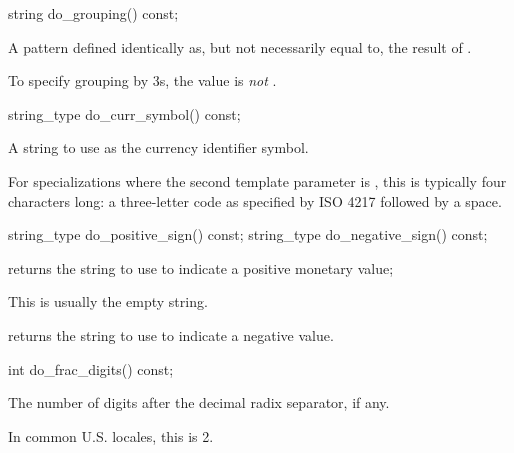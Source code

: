 %
\begin{itemdecl}
string do_grouping() const;
\end{itemdecl}

\begin{itemdescr}
\pnum
\returns
A pattern defined identically as, but not necessarily equal to,
the result of .
\begin{footnote}
To specify grouping by 3s,
the value is  \textit{not} .
\end{footnote}
\end{itemdescr}

%
\begin{itemdecl}
string_type do_curr_symbol() const;
\end{itemdecl}

\begin{itemdescr}
\pnum
\returns
A string to use as the currency identifier symbol.
\begin{note}
For specializations where the second template parameter is ,
this is typically four characters long:
a three-letter code as specified by ISO 4217\supercite{iso4217}
followed by a space.
\end{note}
\end{itemdescr}

%
%
\begin{itemdecl}
string_type do_positive_sign() const;
string_type do_negative_sign() const;
\end{itemdecl}

\begin{itemdescr}
\pnum
\returns
{}
returns the string to use to indicate a positive monetary value;
\begin{footnote}
This is usually the empty string.
\end{footnote}
returns the string to use to indicate a negative value.
\end{itemdescr}

%
\begin{itemdecl}
int do_frac_digits() const;
\end{itemdecl}

\begin{itemdescr}
\pnum
\returns
The number of digits after the decimal radix separator, if any.
\begin{footnote}
In common U.S. locales, this is 2.
\end{footnote}
\end{itemdescr}


